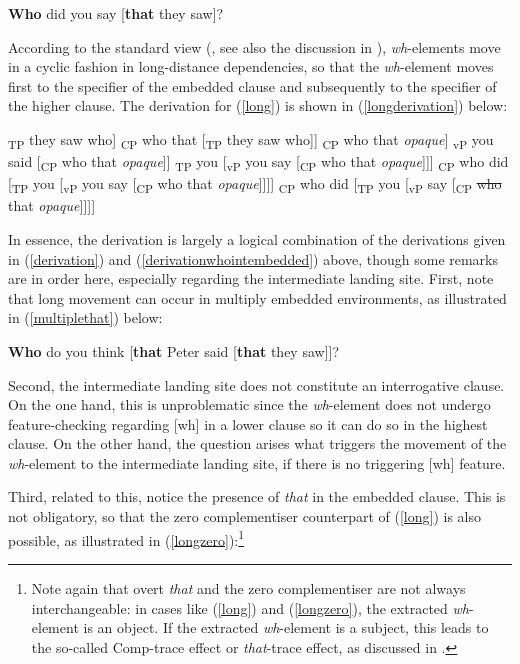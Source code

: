 \ea \textbf{Who} did you say [\textbf{that} they saw]? \label{long}
\z

According to the standard view (\citealt{chomsky1981}, see also the discussion in \citealt{fanselow2017}), \textit{wh}-elements move in a cyclic fashion in long-distance dependencies, so that the \textit{wh}-element moves first to the specifier of the embedded clause and subsequently to the specifier of the higher clause. The derivation for (\ref{long}) is shown in (\ref{longderivation}) below:

\ea \label{longderivation}
\ea {[}\textsubscript{TP} they saw who]
\ex {[}\textsubscript{CP} who that [\textsubscript{TP} they saw who]] \label{whothattp}
\ex {[}\textsubscript{CP} who that \textit{opaque}]
\ex {[}\textsubscript{vP} you said [\textsubscript{CP} who that \textit{opaque}]] 
\ex {[}\textsubscript{TP} you [\textsubscript{vP} you say [\textsubscript{CP} who that \textit{opaque}]]]
\ex {[}\textsubscript{CP} who did [\textsubscript{TP} you [\textsubscript{vP} you say [\textsubscript{CP} who that \textit{opaque}]]]]
\ex {[}\textsubscript{CP} who did [\textsubscript{TP} you [\textsubscript{vP} say [\textsubscript{CP} \sout{who} that \textit{opaque}]]]] 
\z
\z

In essence, the derivation is largely a logical combination of the derivations given in (\ref{derivation}) and (\ref{derivationwhointembedded}) above, though some remarks are in order here, especially regarding the intermediate landing site. First, note that long movement can occur in multiply embedded environments, as illustrated in (\ref{multiplethat}) below:

\ea \textbf{Who} do you think [\textbf{that} Peter said [\textbf{that} they saw]]? \label{multiplethat}
\z

\begin{sloppypar}
Second, the intermediate landing site does not constitute an interrogative clause. On the one hand, this is unproblematic since the \textit{wh}-element does not undergo feature-checking regarding [wh] in a lower clause so it can do so in the highest clause. On the other hand, the question arises what triggers the movement of the \textit{wh}-element to the intermediate landing site, if there is no triggering [wh] feature.
\end{sloppypar}

Third, related to this, notice the presence of \textit{that} in the embedded clause. This is not obligatory, so that the zero complementiser counterpart of (\ref{long}) is also possible, as illustrated in (\ref{longzero}):\footnote{Note again that overt \textit{that} and the zero complementiser are not always interchangeable: in cases like (\ref{long}) and (\ref{longzero}), the extracted \textit{wh}-element is an object. If the extracted \textit{wh}-element is a subject, this leads to the so-called Comp-trace effect or \textit{that}-trace effect, as discussed in .}

